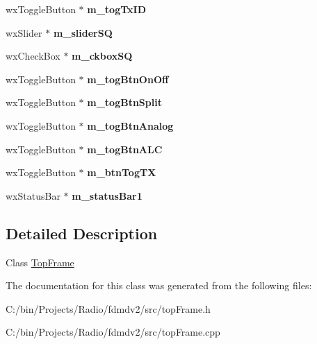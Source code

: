 \begin{DoxyCompactItemize}
\item 
\hypertarget{class_top_frame_af862a4419c535f7ffef6f23b9f2e2a7d}{wx\-Toggle\-Button $\ast$ {\bfseries m\-\_\-tog\-Tx\-I\-D}}\label{class_top_frame_af862a4419c535f7ffef6f23b9f2e2a7d}

\item 
\hypertarget{class_top_frame_a73c219dba416e316b38bd6f095835aaf}{wx\-Slider $\ast$ {\bfseries m\-\_\-slider\-S\-Q}}\label{class_top_frame_a73c219dba416e316b38bd6f095835aaf}

\item 
\hypertarget{class_top_frame_a29df670ba3a1603316bd0eb5b6b9300c}{wx\-Check\-Box $\ast$ {\bfseries m\-\_\-ckbox\-S\-Q}}\label{class_top_frame_a29df670ba3a1603316bd0eb5b6b9300c}

\item 
\hypertarget{class_top_frame_a6c398070906190fbf6c6c3d663cc33ed}{wx\-Toggle\-Button $\ast$ {\bfseries m\-\_\-tog\-Btn\-On\-Off}}\label{class_top_frame_a6c398070906190fbf6c6c3d663cc33ed}

\item 
\hypertarget{class_top_frame_a787ed365379f1fc2a2b51bbde67ad575}{wx\-Toggle\-Button $\ast$ {\bfseries m\-\_\-tog\-Btn\-Split}}\label{class_top_frame_a787ed365379f1fc2a2b51bbde67ad575}

\item 
\hypertarget{class_top_frame_ab788d1aa2da2f2c1458bc7315c7beeef}{wx\-Toggle\-Button $\ast$ {\bfseries m\-\_\-tog\-Btn\-Analog}}\label{class_top_frame_ab788d1aa2da2f2c1458bc7315c7beeef}

\item 
\hypertarget{class_top_frame_ac0cb4ac628d6bd0e25aee632eb9330d2}{wx\-Toggle\-Button $\ast$ {\bfseries m\-\_\-tog\-Btn\-A\-L\-C}}\label{class_top_frame_ac0cb4ac628d6bd0e25aee632eb9330d2}

\item 
\hypertarget{class_top_frame_a1b6c8716d6993f0c28f00a5c6ada789b}{wx\-Toggle\-Button $\ast$ {\bfseries m\-\_\-btn\-Tog\-T\-X}}\label{class_top_frame_a1b6c8716d6993f0c28f00a5c6ada789b}

\item 
\hypertarget{class_top_frame_a71fa08a482cbad3b7b3121b25570c25a}{wx\-Status\-Bar $\ast$ {\bfseries m\-\_\-status\-Bar1}}\label{class_top_frame_a71fa08a482cbad3b7b3121b25570c25a}

\end{DoxyCompactItemize}


\subsection{Detailed Description}
Class \hyperlink{class_top_frame}{Top\-Frame} 

The documentation for this class was generated from the following files\-:\begin{DoxyCompactItemize}
\item 
C\-:/bin/\-Projects/\-Radio/fdmdv2/src/top\-Frame.\-h\item 
C\-:/bin/\-Projects/\-Radio/fdmdv2/src/top\-Frame.\-cpp\end{DoxyCompactItemize}
